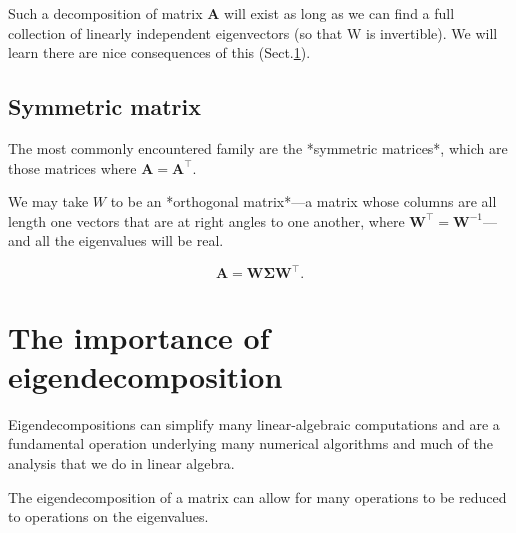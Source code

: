 Such a decomposition of matrix $\mathbf{A}$ will exist as long as we can find a
full collection of linearly independent eigenvectors (so that W is
invertible). We will learn there are nice consequences of this (Sect.\ref{sec:eigendecomposition-usage}).

\subsection{Symmetric matrix}


The most commonly encountered family are the *symmetric matrices*,
which are those matrices where $\mathbf{A} = \mathbf{A}^\top$. 

We may take $W$ to be an *orthogonal matrix*—a matrix whose columns are all
length one vectors that are at right angles to one another, where
$\mathbf{W}^\top = \mathbf{W}^{-1}$—and all the eigenvalues will be real.

\begin{equation}
\mathbf{A} = \mathbf{W}\boldsymbol{\Sigma}\mathbf{W}^\top .
\end{equation}




\section{The importance of eigendecomposition}
\label{sec:eigendecomposition-usage}

Eigendecompositions can simplify many linear-algebraic computations
and are a fundamental operation underlying many numerical algorithms
and much of the analysis that we do in linear algebra.

The eigendecomposition of a matrix can allow for many operations to be reduced
to operations on the eigenvalues.

